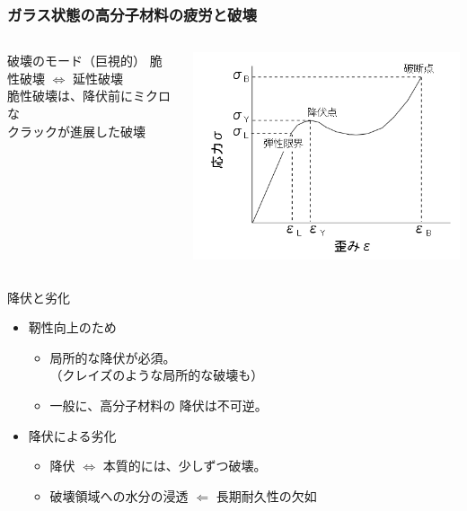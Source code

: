 \documentclass[12pt, dvipdfmx]{beamer}
\begin{document}
\begin{frame}
	\frametitle{ガラス状態の高分子材料の疲労と破壊}
		\begin{columns}[totalwidth=1\textwidth]
				\begin{block}{破壊のモード（巨視的）}
					脆性破壊 $\Leftrightarrow$ 延性破壊\\
					脆性破壊は、降伏前にミクロな\\クラックが進展した破壊
				\end{block}
				\includegraphics[width=.8\textwidth]{S_S_Curve.png}
		\end{columns}
		\begin{exampleblock}{降伏と劣化}
			\begin{itemize}
				\item 靭性向上のため
				\begin{itemize}
					\item {\color{red} 局所的な降伏}が必須。\\（クレイズのような局所的な破壊も）
					\item 一般に、高分子材料の{\color{red} 降伏は不可逆}。
				\end{itemize}
				\item 降伏による劣化
					\begin{itemize}
						\item 降伏 $\Leftrightarrow$ {\color{red} 本質的には、少しずつ破壊。}
						\item {\color{red} 破壊領域への水分の浸透 $\Leftarrow$ 長期耐久性の欠如}
					\end{itemize}
			\end{itemize}
		\end{exampleblock}
\end{frame}
\end{document}
